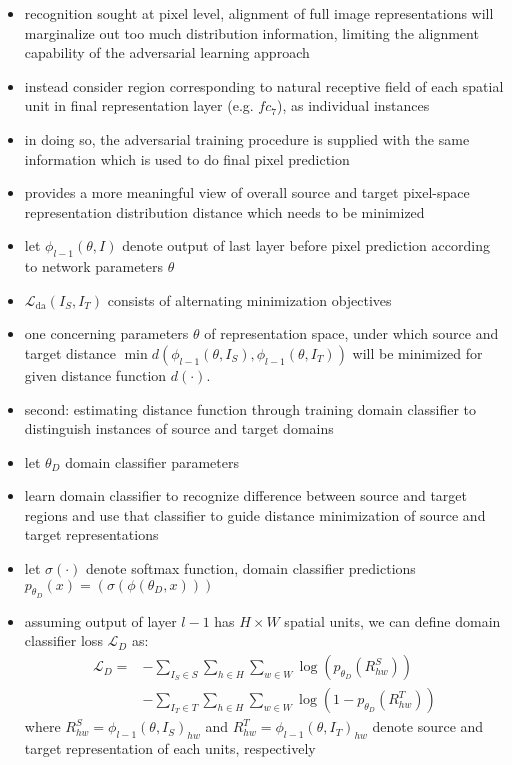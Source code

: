 \documentclass[]{article}
\begin{document}
\begin{itemize}
	\item recognition sought at pixel level, alignment of full image representations will marginalize out too much distribution information, limiting the alignment capability of the adversarial learning approach
	\item instead consider region corresponding to natural receptive field of each spatial unit in final representation layer (e.g. $fc_7$), as individual instances
	\item in doing so, the adversarial training procedure is supplied with the same information which is used to do final pixel prediction
	\item provides a more meaningful view of overall source and target pixel-space representation distribution distance which needs to be minimized
	\item let $\phi_{l-1}(\theta, I)$ denote output of last layer before pixel prediction according to network parameters $\theta$
	\item $\mathcal{L}_{\text{da}}(I_S, I_T)$ consists of alternating minimization objectives
	\item one concerning parameters $\theta$ of representation space, under which source and target distance $\min d(\phi_{l-1}(\theta, I_S), \phi_{l-1}(\theta, I_T))$ will be minimized for given distance function $d(\cdot)$.
	\item second: estimating distance function through training domain classifier to distinguish instances of source and target domains
	\item let $\theta_D$ domain classifier parameters
	\item learn domain classifier to recognize difference between source and target regions and use that classifier to guide distance minimization of source and target representations
	\item let $\sigma (\cdot)$ denote softmax function, domain classifier predictions $p_{\theta_D}(x) = (\sigma(\phi(\theta_{D}, x)))$
	\item assuming output of layer $l-1$ has $H \times W$ spatial units, we can define domain classifier loss $\mathcal{L}_D$ as:
	\begin{align}
	\mathcal{L}_D = &- \sum_{I_S \in S} \sum_{h\in H}\sum_{w \in W} \log ( p_{\theta_D}(R^S_{hw}))\\
	&- \sum_{I_T \in T} \sum_{h\in H}\sum_{w \in W} \log (1 - p_{\theta_D}(R^T_{hw}))
	\end{align}
	where $R^S_{hw} = \phi_{l-1}(\theta, I_S)_{hw}$ and $R^T_{hw} = \phi_{l-1}(\theta, I_T)_{hw}$ denote source and target representation of each units, respectively

\end{itemize}
\end{document}
